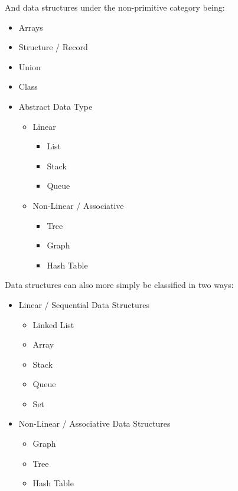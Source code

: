 \documentclass[12pt letter]{report}
\begin{document}
And data structures under the non-primitive category being:
\begin{itemize}
  \item Arrays
  \item Structure / Record
  \item Union
  \item Class
  \item Abstract Data Type
        \begin{itemize}
          \item Linear
                \begin{itemize}
                  \item List
                  \item Stack
                  \item Queue
                \end{itemize}
          \item Non-Linear / Associative
                \begin{itemize}
                  \item Tree
                  \item Graph
                  \item Hash Table
                \end{itemize}
        \end{itemize}
\end{itemize}

Data structures can also more simply be classified in two ways:
\begin{itemize}
  \item Linear / Sequential Data Structures
        \begin{itemize}
          \item Linked List
          \item Array
          \item Stack
          \item Queue
          \item Set
        \end{itemize}
  \item Non-Linear / Associative  Data Structures
        \begin{itemize}
          \item Graph
          \item Tree
          \item Hash Table
        \end{itemize}
\end{itemize}
\end{document}
